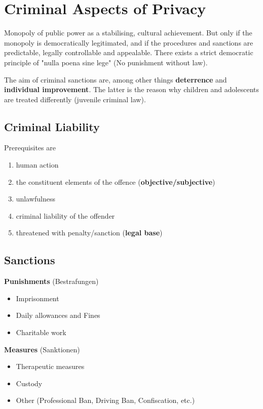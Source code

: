 \documentclass[11pt]{article}
\theoremstyle{definition}
\begin{document}
\section{Criminal Aspects of Privacy}
Monopoly of public power as a stabilising, cultural achievement. But only if the monopoly is democratically legitimated, and if the procedures and sanctions are predictable, legally controllable and appealable. There exists a strict democratic principle of "nulla poena sine lege" (No punishment without law).

The aim of criminal sanctions are, among other things \textbf{deterrence} and \textbf{individual improvement}. The latter is the reason why children and adolescents are treated differently (juvenile criminal law).

\subsection{Criminal Liability}
Prerequisites are
\begin{enumerate}
	\item human action
	\item the constituent elements of the offence (\textbf{objective/subjective})
	\item unlawfulness
	\item criminal liability of the offender
	\item threatened with penalty/sanction (\textbf{legal base})
\end{enumerate}

\subsection{Sanctions}
\textbf{Punishments} (Bestrafungen)
\begin{itemize}
	\item Imprisonment
	\item Daily allowances and Fines
	\item Charitable work
\end{itemize}

\vspace{1em}
\noindent
\textbf{Measures} (Sanktionen)
\begin{itemize}
	\item Therapeutic measures
	\item Custody
	\item Other (Professional Ban, Driving Ban, Confiscation, etc.)
\end{itemize}
\end{document}
